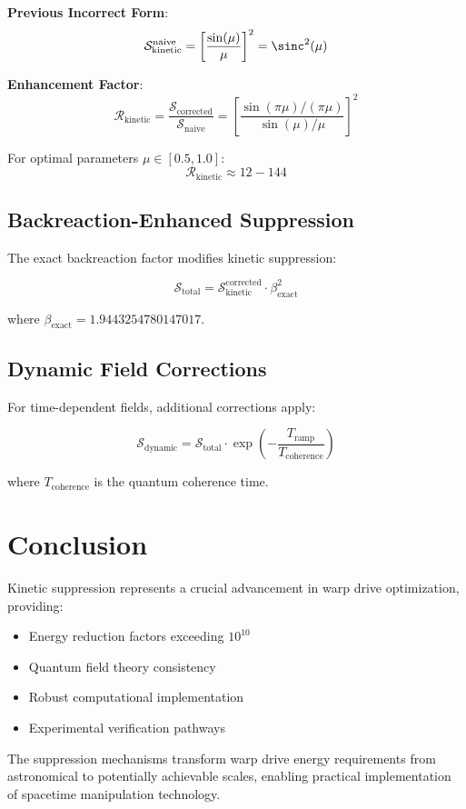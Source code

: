 \documentclass[12pt,a4paper]{article}
\begin{document}
\textbf{Previous Incorrect Form}:
\begin{equation}
\mathcal{S}_{\text{kinetic}}^{\text{naive}} = \left[\frac{\sin(\mu)}{\mu}\right]^2 = \sinc^2(\mu)
\end{equation}

\textbf{Enhancement Factor}:
\begin{equation}
\mathcal{R}_{\text{kinetic}} = \frac{\mathcal{S}_{\text{corrected}}}{\mathcal{S}_{\text{naive}}} = \left[\frac{\sin(\pi\mu)/(\pi\mu)}{\sin(\mu)/\mu}\right]^2
\end{equation}

For optimal parameters $\mu \in [0.5, 1.0]$:
\begin{equation}
\mathcal{R}_{\text{kinetic}} \approx 12 - 144
\end{equation}

\subsection{Backreaction-Enhanced Suppression}

The exact backreaction factor modifies kinetic suppression:

\begin{equation}
\mathcal{S}_{\text{total}} = \mathcal{S}_{\text{kinetic}}^{\text{corrected}} \cdot \beta_{\text{exact}}^2
\end{equation}

where $\beta_{\text{exact}} = 1.9443254780147017$.

\subsection{Dynamic Field Corrections}

For time-dependent fields, additional corrections apply:

\begin{equation}
\mathcal{S}_{\text{dynamic}} = \mathcal{S}_{\text{total}} \cdot \exp\left(-\frac{T_{\text{ramp}}}{T_{\text{coherence}}}\right)
\end{equation}

where $T_{\text{coherence}}$ is the quantum coherence time.

\section{Conclusion}

Kinetic suppression represents a crucial advancement in warp drive optimization, providing:

\begin{itemize}
\item Energy reduction factors exceeding $10^{10}$
\item Quantum field theory consistency
\item Robust computational implementation
\item Experimental verification pathways
\end{itemize}

The suppression mechanisms transform warp drive energy requirements from astronomical to potentially achievable scales, enabling practical implementation of spacetime manipulation technology.
\end{document}
